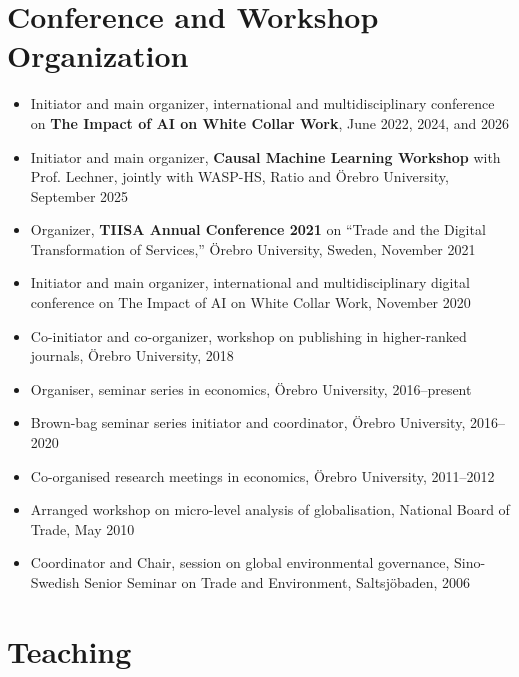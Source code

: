 \documentclass[11pt,a4paper]{article}
\newcommand{\cventry}[1]{\item #1}
\begin{document}
\section{Conference and Workshop Organization}

\begin{itemize}
  \cventry{Initiator and main organizer, international and multidisciplinary conference on \textbf{The Impact of AI on White Collar Work}, June 2022, 2024, and 2026}
  \cventry{Initiator and main organizer, \textbf{Causal Machine Learning Workshop} with Prof. Lechner, jointly with WASP-HS, Ratio and Örebro University, September 2025}
  \cventry{Organizer, \textbf{TIISA Annual Conference 2021} on ``Trade and the Digital Transformation of Services,'' Örebro University, Sweden, November 2021}
  \cventry{Initiator and main organizer, international and multidisciplinary digital conference on The Impact of AI on White Collar Work, November 2020}
  \cventry{Co-initiator and co-organizer, workshop on publishing in higher-ranked journals, Örebro University, 2018}
  \cventry{Organiser, seminar series in economics, Örebro University, 2016--present}
  \cventry{Brown-bag seminar series initiator and coordinator, Örebro University, 2016--2020}
  \cventry{Co-organised research meetings in economics, Örebro University, 2011--2012}
  \cventry{Arranged workshop on micro-level analysis of globalisation, National Board of Trade, May 2010}
  \cventry{Coordinator and Chair, session on global environmental governance, Sino-Swedish Senior Seminar on Trade and Environment, Saltsjöbaden, 2006}
\end{itemize}

\section{Teaching}
\end{document}
